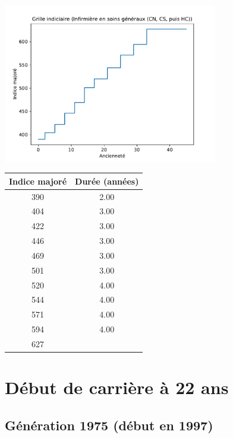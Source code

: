 \begin{minipage}{0.55\linewidth}\includegraphics[width=0.7\textwidth]{fig/grille_Infirmier.pdf}\end{minipage} 
\begin{minipage}{0.3\linewidth} 
 \begin{center} 

\begin{tabular}[htb]{|c|c|} 
\hline 
 Indice majoré &  Durée (années) \\ 
\hline \hline 
 390 &  2.00 \\ 
\hline 
 404 &  3.00 \\ 
\hline 
 422 &  3.00 \\ 
\hline 
 446 &  3.00 \\ 
\hline 
 469 &  3.00 \\ 
\hline 
 501 &  3.00 \\ 
\hline 
 520 &  4.00 \\ 
\hline 
 544 &  4.00 \\ 
\hline 
 571 &  4.00 \\ 
\hline 
 594 &  4.00 \\ 
\hline 
 627 &   \\ 
\hline 
\hline 
\end{tabular} 
\end{center} 
 \end{minipage} 


 \addto{\captionsenglish}{ \renewcommand{\mtctitle}{}} \setcounter{minitocdepth}{2} 
 \minitoc \newpage 

\section{Début de carrière à 22 ans} 

\subsection{Génération 1975 (début en 1997)} 

